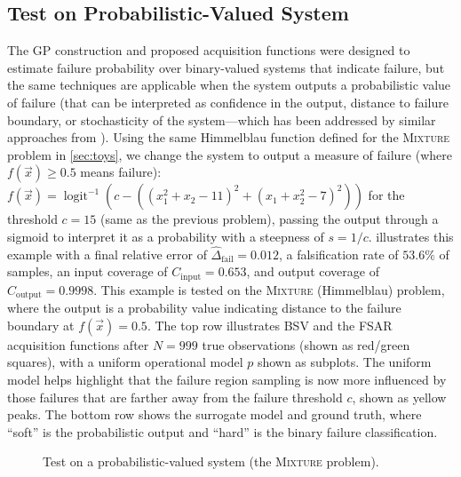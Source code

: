 \subsection{Test on Probabilistic-Valued System}\label{sec:prob_valued_sys}
The GP construction and proposed acquisition functions were designed to estimate failure probability over binary-valued systems that indicate failure, but the same techniques are applicable when the system outputs a probabilistic value of failure (that can be interpreted as confidence in the output, distance to failure boundary, or stochasticity of the system---which has been addressed by similar approaches from \textcite{gong2022sequential}).
Using the same Himmelblau function \cite{himmelblau1972applied} defined for the \textsc{Mixture} problem in \cref{sec:toys}, we change the system to output a measure of failure (where $f(\vec{x}) \ge 0.5$ means failure):  $f(\vec{x}) = \operatorname{logit}^{-1}\left(c - \left((x_1^2 + x_2 - 11)^2 + (x_1 + x_2^2 - 7)^2\right) \right)$ for the threshold $c=15$ (same as the previous problem), passing the output through a sigmoid to interpret it as a probability with a steepness of $s=1/c$.
 illustrates this example with a final relative error of $\hat{\Delta}_\text{fail} = \num{0.012}$, a falsification rate of $53.6\%$ of samples, an input coverage of $C_\text{input}=0.653$, and output coverage of $C_\text{output}=0.9998$.
This example is tested on the \textsc{Mixture} (Himmelblau) problem, where the output is a probability value indicating distance to the failure boundary at $f(\vec{x}) = \num{0.5}$.
The top row illustrates BSV and the FSAR acquisition functions after $N=\num{999}$ true observations (shown as red/green squares), with a uniform operational model $p$ shown as subplots.
The uniform model helps highlight that the failure region sampling is now more influenced by those failures that are farther away from the failure threshold $c$, shown as yellow peaks.
The bottom row shows the surrogate model and ground truth, where ``soft'' is the probabilistic output and ``hard'' is the binary failure classification.


\begin{figure}[t!]
    \centering
    
    \caption{Test on a probabilistic-valued system (the \textsc{Mixture} problem).}
    \label{fig:prob_valued}
\end{figure}


